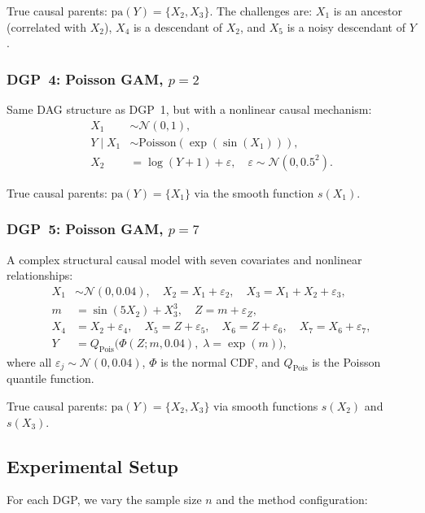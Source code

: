 \documentclass[11pt,a4paper]{article}
\newcommand{\pa}{\mathrm{pa}}
\begin{document}
True causal parents: $\pa(Y) = \{X_2, X_3\}$. The challenges are: $X_1$ is an ancestor (correlated with $X_2$), $X_4$ is a descendant of $X_2$, and $X_5$ is a noisy descendant of $Y$.

\subsubsection{DGP~4: Poisson GAM, $p = 2$}

Same DAG structure as DGP~1, but with a nonlinear causal mechanism:
\begin{align}
X_1 &\sim \mathcal{N}(0, 1), \\
Y \mid X_1 &\sim \text{Poisson}(\exp(\sin(X_1))), \\
X_2 &= \log(Y + 1) + \varepsilon, \quad \varepsilon \sim \mathcal{N}(0, 0.5^2).
\end{align}

True causal parents: $\pa(Y) = \{X_1\}$ via the smooth function $s(X_1)$.

\subsubsection{DGP~5: Poisson GAM, $p = 7$}

A complex structural causal model with seven covariates and nonlinear relationships:
\begin{align}
X_1 &\sim \mathcal{N}(0, 0.04), \quad X_2 = X_1 + \varepsilon_2, \quad X_3 = X_1 + X_2 + \varepsilon_3, \\
m &= \sin(5 X_2) + X_3^3, \quad Z = m + \varepsilon_Z, \\
X_4 &= X_2 + \varepsilon_4, \quad X_5 = Z + \varepsilon_5, \quad X_6 = Z + \varepsilon_6, \quad X_7 = X_6 + \varepsilon_7, \\
Y &= Q_{\text{Pois}}\!\big(\Phi(Z; m, 0.04),\; \lambda = \exp(m)\big),
\end{align}
where all $\varepsilon_j \sim \mathcal{N}(0, 0.04)$, $\Phi$ is the normal CDF, and $Q_{\text{Pois}}$ is the Poisson quantile function.

True causal parents: $\pa(Y) = \{X_2, X_3\}$ via smooth functions $s(X_2)$ and $s(X_3)$.

\subsection{Experimental Setup}

For each DGP, we vary the sample size $n$ and the method configuration:
\end{document}
